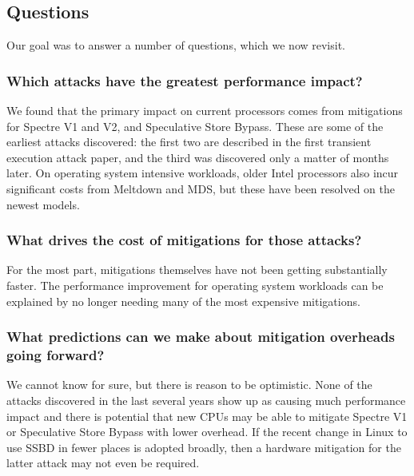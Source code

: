 \subsection{Questions}

Our goal was to answer a number of questions, which we now revisit.

\subsubsection{Which attacks have the greatest performance impact?}

We found that the primary impact on current processors comes from mitigations for Spectre V1 and V2, and Speculative Store Bypass.
These are some of the earliest attacks discovered: the first two are described in the first transient execution attack paper, and the third was discovered only a matter of months later.
On operating system intensive workloads, older Intel processors also incur significant costs from Meltdown and MDS, but these have been resolved on the newest models.

\subsubsection{What drives the cost of mitigations for those attacks?}

For the most part, mitigations themselves have not been getting substantially faster.
The performance improvement for operating system workloads can be explained by no longer needing many of the most expensive mitigations.

\subsubsection{What predictions can we make about mitigation overheads going forward?}

We cannot know for sure, but there is reason to be optimistic.
None of the attacks discovered in the last several years show up as causing much performance impact and there is potential that new CPUs may be able to mitigate Spectre V1 or Speculative Store Bypass with lower overhead.
If the recent change in Linux to use SSBD in fewer places is adopted broadly, then a hardware mitigation for the latter attack may not even be required.

